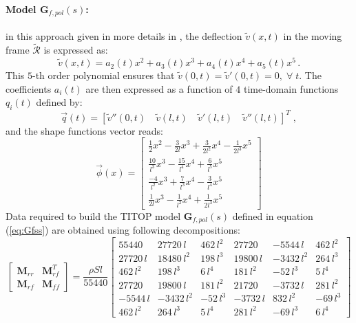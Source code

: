 \paragraph{Model $\mathbf{G}_{f,pol}(s)$:} in this approach given in more details in \cite{Murali2015}, the deflection $\widetilde{v}(x,t)$ in the moving frame $\widetilde{\mathcal{R}}$ is expressed as:
\[
\widetilde{v}(x,t)=a_2(t)x^2+a_3(t)x^3+a_4(t)x^4+a_5(t)x^5\,.
\]
This $5$-th order polynomial ensures that $\widetilde{v}(0,t)=\widetilde{v}'(0,t)=0,\;\forall\;t$. The coefficients $a_i(t)$ are then expressed as a function of $4$ time-domain functions $q_i(t)$ defined by:
\begin{equation}\label{eq:defq}
\vec{q}(t)=[\widetilde{v}''(0,t)\quad \widetilde{v}(l,t)\quad \widetilde{v}'(l,t)\quad \widetilde{v}''(l,t)]^T\;,
\end{equation}
and the shape functions vector reads:
\begin{equation}\label{eq:Phi}
  \vec{\phi}(x)=\left[\begin{array}{c}\frac{1}{2}x^2-\frac{3}{2l}x^3+\frac{3}{2l^2}x^4-\frac{1}{2l^3}x^5\\ \frac{10}{l^3}x^3-\frac{15}{l^4}x^4+\frac{6}{l^5}x^5\\
\frac{-4}{l^2}x^3+\frac{7}{l^3}x^4-\frac{3}{l^4}x^5\\
\frac{1}{2l}x^3-\frac{1}{l^2}x^4+\frac{1}{2l^3}x^5\end{array}\right]
\end{equation}
Data required to build the TITOP model $\mathbf{G}_{f,pol}(s)$ defined in equation (\ref{eq:Gfss}) are obtained using following decompositions:
\begin{equation}\label{eq:mass}
\left[\begin{array}{c|c}\mathbf{M}_{rr} & \mathbf{M}_{rf}^T \\\hline \mathbf{M}_{rf} & \mathbf{M}_{ff} \end{array}\right]=\frac{\rho S l}{55440}\left[\begin{array}{cc|cccc}
    55440 & 27720\,l &  462\,l^2 & 27720 & -5544\,l &  462\,l^2\\
         27720\,l& 18480\,l^2 &198\,l^3 &19800\,l &-3432\,l^2 &264\,l^3\\\hline
         462\,l^2 &198\,l^3&   6\,l^4 &  181\,l^2&  -52\,l^3&    5\,l^4\\
         27720&   19800\,l&   181\,l^2&  21720&  -3732\,l &  281\,l^2\\
         -5544\,l& -3432\,l^2& -52\,l^3 &-3732\,l& 832\,l^2 &  -69\,l^3\\
         462\,l^2 &264\,l^3  &  5\,l^4&  281\,l^2 &-69\,l^3  &   6\,l^4
 \end{array}\right]
\end{equation}
